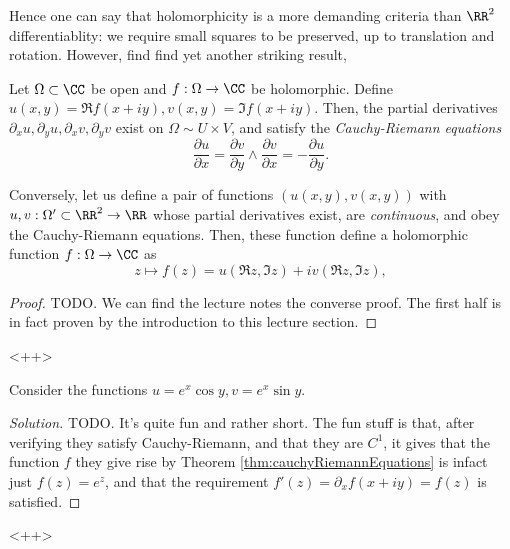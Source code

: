 Hence one can say that holomorphicity is a more demanding criteria than $\RR^2$
differentiablity: we require small squares to be preserved, up to translation
and rotation. However, find find yet another striking result,
\begin{theorem}
  Let $\Omega\subset\CC$ be open and $f:\Omega\to\CC$ be holomorphic. Define
  $u(x,y)=\Re f(x+iy), v(x,y)=\Im f(x+iy)$. Then, the partial derivatives
  $\partial_x u, \partial_y u, \partial_x v, \partial_y v$ exist on $\Omega\sim
  U\times V$, and satisfy the \emph{Cauchy-Riemann equations}
  \[\frac{\partial u}{\partial x} = \frac{\partial v}{\partial y}\land
  \frac{\partial v}{\partial x} = -\frac{\partial u}{\partial y}.\]

  Conversely, let us define a pair of functions $(u(x,y),v(x,y))$ with
  $u,v:\Omega'\subset\RR^2\to\RR$ whose partial derivatives exist, are
  \emph{continuous}, and obey the Cauchy-Riemann equations. Then, these function
  define a holomorphic function $f:\Omega\to\CC$ as
  \[z\mapsto f(z)=u(\Re z, \Im z) + iv(\Re z, \Im z),\]
  \label{thm:cauchyRiemannEquations}
\end{theorem}
\begin{proof}
  TODO. We can find the lecture notes the converse proof. The first half is in
  fact proven by the introduction to this lecture section.
\end{proof}<++>
\begin{exercise}
  Consider the functions $u=e^x\cos y, v=e^x\sin y$.
\end{exercise}
\begin{proof}[Solution]
  TODO. It's quite fun and rather short. The fun stuff is that, after verifying
  they satisfy Cauchy-Riemann, and that they are $C^1$, it gives that the
  function $f$ they give rise by Theorem \ref{thm:cauchyRiemannEquations} is
  infact just $f(z)=e^z$, and that the requirement $f'(z)=\partial_x
  f(x+iy)=f(z)$ is satisfied.
\end{proof}<++>
